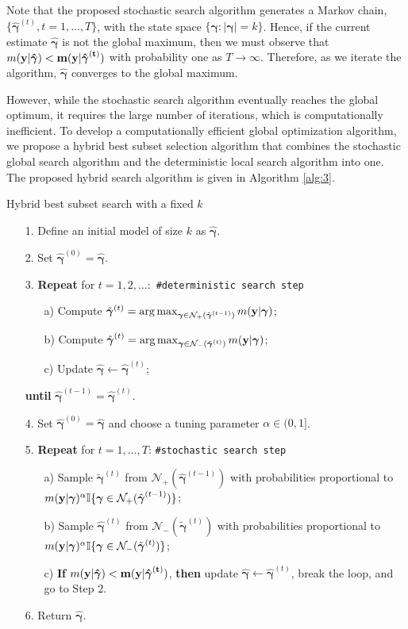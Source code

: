 \documentclass[twocolumn]{svjour3}       %
\newcommand{\uy}{\bf y} %
\newcommand{\0}{\boldsymbol 0} %
\newcommand{\1}{\boldsymbol 1} %
\newcommand{\bg}{\boldsymbol \gamma} %
\begin{document}
Note that the proposed stochastic search algorithm generates a Markov chain, $\{\hat{\bg}^{(t)},t=1,\ldots,T\}$, with the state space $\{\bg:|\bg|=k\}$. Hence, if the current estimate $\hat{\bg}$ is not the global maximum, then we must observe that $m(\uy|\hat{\bg})<m(\uy|\hat{\bg}^{(t)})$ with probability one as $T\to \infty$. Therefore, as we iterate the algorithm, $\hat{\bg}$ converges to the global maximum.

However, while the stochastic search algorithm eventually reaches the global optimum, it requires the large number of iterations, which is computationally inefficient. To develop a computationally efficient global optimization algorithm, we propose a hybrid best subset selection algorithm that combines the stochastic global search algorithm and the deterministic local search algorithm into one. The proposed hybrid search algorithm is given in Algorithm \ref{alg:3}.
\begin{algorithm}[ht!]
\caption{Hybrid best subset search with a fixed $k$}\label{alg:3}
\begin{itemize}\itemsep=0pt
\item[1.] Define an initial model of size $k$ as $\hat{\bg}$.
\item[2.] Set $\hat{\bg}^{(0)}=\hat{\bg}$.
\item[3.] \textbf{Repeat} for $t=1,2,\ldots:$ \quad \texttt{\#deterministic search step}
\begin{itemize}\itemsep=0pt
\item[a)] Compute $\tilde{\bg}^{(t)} = \arg\max_{\bg  \in \mathcal{N}_+(\hat{\bg}^{(t-1)} ) } m(\uy|\bg)$; 
\item[b)] Compute $\hat{\bg}^{(t)}=  \arg\max_{\bg  \in \mathcal{N}_-(\tilde{\bg}^{(t)} ) } m(\uy|\bg)$;
\item[c)] Update $\hat{\bg}\leftarrow \hat{\bg}^{(t)}$;
\end{itemize}
\item[] \textbf{until} $\hat{\bg}^{(t-1)}=\hat{\bg}^{(t)}$.
\item[4.] Set $\hat{\bg}^{(0)}=\hat{\bg}$ and choose a tuning parameter $\alpha \in (0,1]$.
\item[5.] \textbf{Repeat} for $t=1,\ldots,T$: \quad \texttt{\#stochastic search step}
\begin{itemize}
\item[a)] Sample $\tilde{\bg}^{(t)}$ from $\mathcal{N}_+(\hat{\bg}^{(t-1)} )$ with probabilities proportional to ${m(\uy|\bg)^\alpha}\mathbb{I}\{\bg \in \mathcal{N}_+(\hat{\bg}^{(t-1)} ) \}$;
\item[b)] Sample $\hat{\bg}^{(t)}$ from $\mathcal{N}_-(\tilde{\bg}^{(t)} )$ with probabilities proportional to ${m(\uy|\bg)^\alpha}\mathbb{I}\{\bg \in \mathcal{N}_-(\tilde{\bg}^{(t)} ) \}$;
\item[c)] \textbf{If} $m(\uy|\hat{\bg})<m(\uy|\hat{\bg}^{(t)})$, \textbf{then} update $\hat{\bg}\leftarrow \hat{\bg}^{(t)}$, break the loop, and go to Step 2.
\end{itemize}
\item[6.] Return $\hat{\bg}$.
\end{itemize}
\end{algorithm}
\end{document}
